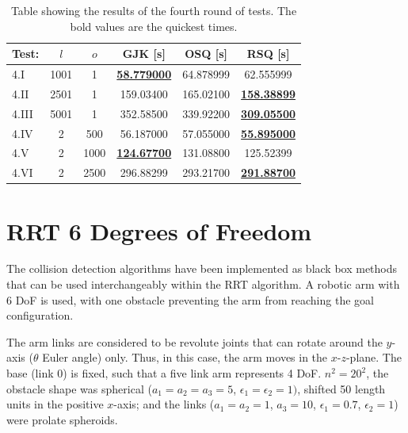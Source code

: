 \begin{table}[h]
	\centering
	\caption{Table showing the results of the fourth round of tests. The bold values are the quickest times.}
	\begin{tabular}{|l|c|c|c|c|c|}
		\hline
		Test: 	&	$l$		&	$o$	&	\gls{GJK} [s] & O\gls{SQ} [s] & R\gls{SQ} [s]\\
		\hline
		4.I 	&	1001	&	1	&	\underline{\textbf{58.779000}}	&	64.878999	&	62.555999	\\
		4.II 	&	2501	&	1	&	159.03400	&	165.02100	&	\underline{\textbf{158.38899}}	\\
		4.III 	&	5001	&	1	&	352.58500	&	339.92200	&	\underline{\textbf{309.05500}}	\\
\hline
		4.IV 	&	2		&	500	&	56.187000	&	57.055000	&	\underline{\textbf{55.895000}}	\\
		4.V 	&	2		&	1000&	\underline{\textbf{124.67700}}	&	131.08800	&	125.52399	\\
		4.VI 	&	2		&	2500&	296.88299	&	293.21700	&	\underline{\textbf{291.88700}}	\\
		\hline         
	\end{tabular}
	\label{Table:4}
\end{table}


\section{RRT 6 Degrees of Freedom} \label{subsec:TestRRT}

The collision detection algorithms have been implemented as black box methods that can be used interchangeably within the \gls{RRT} algorithm. A robotic arm with 6 \gls{DoF} is used, with one obstacle preventing the arm from reaching the goal configuration.

The arm links are considered to be revolute joints that can rotate around the $y$-axis ($\theta$ Euler angle) only. Thus, in this case, the arm moves in the $x$-$z$-plane. The base (link 0) is fixed, such that a five link arm represents 4 \gls{DoF}. $n^2=20^2$, the obstacle shape was spherical ($a_1=a_2=a_3=5$, $\epsilon_1=\epsilon_2 = 1)$, shifted 50 length units in the positive $x$-axis; and the links ($a_1=a_2=1$, $a_3=10$, $\epsilon_1=0.7$, $\epsilon_2 = 1$) were prolate spheroids.

